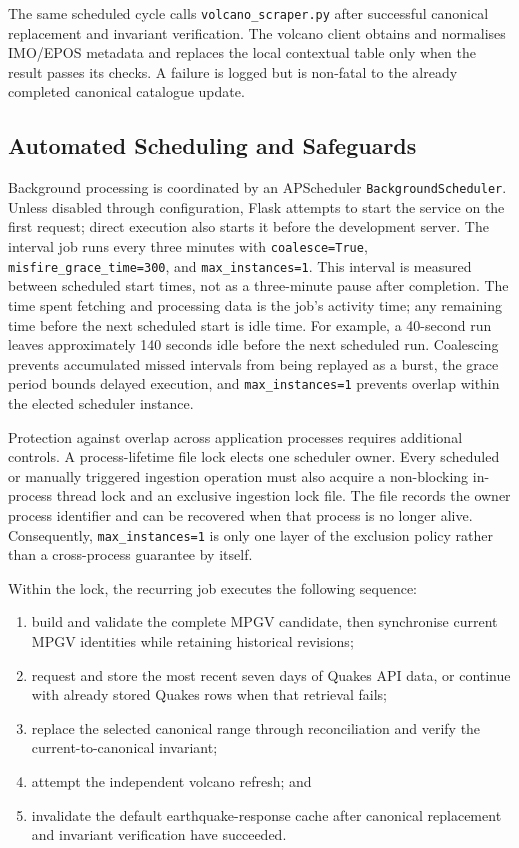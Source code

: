 \documentclass[12pt]{article}
\begin{document}
The same scheduled cycle calls \texttt{volcano\_scraper.py} after successful canonical replacement and invariant verification. The volcano client obtains and normalises IMO/EPOS metadata and replaces the local contextual table only when the result passes its checks. A failure is logged but is non-fatal to the already completed canonical catalogue update.

\subsection{Automated Scheduling and Safeguards}

Background processing is coordinated by an APScheduler \texttt{BackgroundScheduler}. Unless disabled through configuration, Flask attempts to start the service on the first request; direct execution also starts it before the development server. The interval job runs every three minutes with \texttt{coalesce=True}, \texttt{misfire\_grace\_time=300}, and \texttt{max\_instances=1}. This interval is measured between scheduled start times, not as a three-minute pause after completion. The time spent fetching and processing data is the job's activity time; any remaining time before the next scheduled start is idle time. For example, a 40-second run leaves approximately 140 seconds idle before the next scheduled run. Coalescing prevents accumulated missed intervals from being replayed as a burst, the grace period bounds delayed execution, and \texttt{max\_instances=1} prevents overlap within the elected scheduler instance.

Protection against overlap across application processes requires additional controls. A process-lifetime file lock elects one scheduler owner. Every scheduled or manually triggered ingestion operation must also acquire a non-blocking in-process thread lock and an exclusive ingestion lock file. The file records the owner process identifier and can be recovered when that process is no longer alive. Consequently, \texttt{max\_instances=1} is only one layer of the exclusion policy rather than a cross-process guarantee by itself.

\newpage

Within the lock, the recurring job executes the following sequence:

\begin{enumerate}
    \item build and validate the complete MPGV candidate, then synchronise current MPGV identities while retaining historical revisions;
    \item request and store the most recent seven days of Quakes API data, or continue with already stored Quakes rows when that retrieval fails;
    \item replace the selected canonical range through reconciliation and verify the current-to-canonical invariant;
    \item attempt the independent volcano refresh; and
    \item invalidate the default earthquake-response cache after canonical replacement and invariant verification have succeeded.
\end{enumerate}
\end{document}
